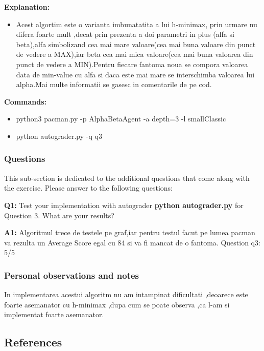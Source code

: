 \textbf{Explanation:}
\begin{itemize}
    \setlength\itemsep{0em}
    \item Acest algortim este o varianta imbunatatita a lui h-minimax, prin urmare nu difera foarte mult ,decat prin prezenta a doi parametri in plus (alfa si beta),alfa simbolizand cea mai mare valoare(cea mai buna valoare din punct de vedere a MAX),iar beta cea mai mica valoare(cea mai buna valoarea din punct de vedere a MIN).Pentru fiecare fantoma noua se compora valoarea data de min-value cu alfa si daca este mai mare se interschimba valoarea lui alpha.Mai multe informatii se gasesc in comentarile de pe cod.

\end{itemize}


\textbf{Commands:}
\begin{itemize}
    \setlength\itemsep{0em}
    \item   python3 pacman.py -p AlphaBetaAgent -a depth=3 -l smallClassic
\item python autograder.py -q q3
        
\end{itemize}

\subsubsection{Questions}
This sub-section is dedicated to the additional questions that come along with the exercise. Please answer to the following questions:\newline


\textbf{Q1:} Test your implementation with autograder \textbf{python autograder.py} for Question 3. What are your results?

\textbf{A1:} Algoritmul trece de testele pe graf,iar pentru testul facut pe lumea pacman va rezulta un Average Score egal cu 84 si va fi mancat de o fantoma. Question q3: 5/5


\subsubsection{Personal observations and notes}
In implementarea acestui algoritm nu am intampinat dificultati ,deoarece este foarte asemanator cu h-minimax ,dupa cum se poate observa ,ca l-am si implementat foarte asemanator.

\vspace{0.75cm}

\subsection{References}

